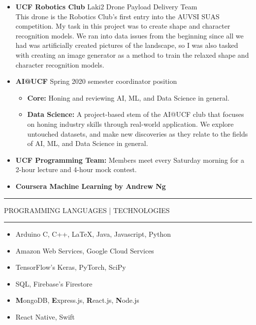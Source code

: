 \documentclass{article}
\newcommand{\makesection}[1]{\hrule\vskip1mm\uppercase{#1}\vskip1mm\hrule}
\begin{document}
    \begin{itemize}[leftmargin=.35cm]
        \item \textbf{UCF Robotics Club} Laki2 Drone Payload Delivery Team \\
        This drone is the Robotics Club's first entry into the AUVSI SUAS competition. My task
        in this project was to create shape and character recognition models. We ran into data
        issues from the beginning since all we had was artificially created pictures of the
        landscape, so I was also tasked with creating an image generator as a method to train
        the relaxed shape and character recognition models.
        \item \textbf{AI@UCF} Spring 2020 semester coordinator position 
        \vspace*{-.05cm}
        \begin{itemize}[$\circ$]
            \item \textbf{Core:} Honing and reviewing AI, ML, and Data Science in general.
            \item \textbf{Data Science:} A project-based stem of the AI@UCF club that focuses
            on honing industry skills through real-world application. We explore untouched
            datasets, and make new discoveries as they relate to the fields of AI, ML, and
            Data Science in general.
        \end{itemize}
        \item \textbf{UCF Programming Team:} Members meet every Saturday morning for a 2-hour lecture
        and 4-hour mock contest.
        \item \textbf{Coursera Machine Learning by Andrew Ng}
    \end{itemize}
        
    \makesection{Programming Languages | Technologies}
    \vspace*{-2mm}
    \begin{multicols}{2}\begin{itemize}[leftmargin=.35cm]
        \setlength\itemsep{-.1cm}
        \item Arduino C, C++, \LaTeX, Java, Javascript, Python
        \item Amazon Web Services, Google Cloud Services
        \item TensorFlow's Keras, PyTorch, SciPy
        \item SQL, Firebase's Firestore
        \item \textbf{M}ongoDB, \textbf{E}xpress.js, \textbf{R}eact.js, \textbf{N}ode.js
        \item React Native, Swift 
    \end{itemize}\end{multicols}
\end{document}
